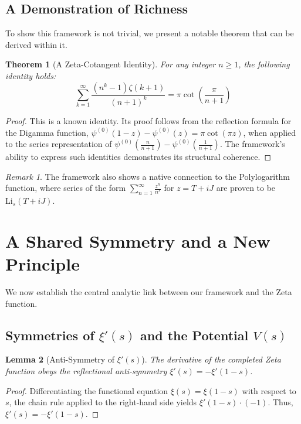 \documentclass{amsart}
\theoremstyle{plain}
\newtheorem{theorem}{Theorem}[section]
\newtheorem{lemma}[theorem]{Lemma}
\theoremstyle{definition}
\theoremstyle{remark}
\newtheorem*{remark}{Remark}
\begin{document}
\subsection{A Demonstration of Richness}
To show this framework is not trivial, we present a notable theorem that can be derived within it.
\begin{theorem}[A Zeta-Cotangent Identity]
For any integer $n \ge 1$, the following identity holds:
\[ \sum_{k=1}^{\infty} \frac{(n^k-1)\zeta(k+1)}{(n+1)^k} = \pi \cot\left(\frac{\pi}{n+1}\right) \]
\end{theorem}
\begin{proof}
This is a known identity. Its proof follows from the reflection formula for the Digamma function, $\psi^{(0)}(1-z)-\psi^{(0)}(z)=\pi\cot(\pi z)$, when applied to the series representation of $\psi^{(0)}(\frac{n}{n+1})-\psi^{(0)}(\frac{1}{n+1})$. The framework's ability to express such identities demonstrates its structural coherence.
\end{proof}
\begin{remark}
The framework also shows a native connection to the Polylogarithm function, where series of the form $\sum_{n=1}^\infty \frac{z^n}{n^s}$ for $z=T+iJ$ are proven to be $\mathrm{Li}_s(T+iJ)$.
\end{remark}

\section{A Shared Symmetry and a New Principle}
We now establish the central analytic link between our framework and the Zeta function.

\subsection{Symmetries of \texorpdfstring{$\xi'(s)$ and the Potential $V(s)$}{xi'(s) and the Potential V(s)}}
\begin{lemma}[Anti-Symmetry of $\xi'(s)$]
\label{lem:xi_anti_symmetry}
The derivative of the completed Zeta function obeys the reflectional anti-symmetry $\xi'(s) = -\xi'(1-s)$.
\end{lemma}
\begin{proof}
Differentiating the functional equation $\xi(s) = \xi(1-s)$ with respect to $s$, the chain rule applied to the right-hand side yields $\xi'(1-s) \cdot (-1)$. Thus, $\xi'(s) = -\xi'(1-s)$.
\end{proof}
\end{document}
